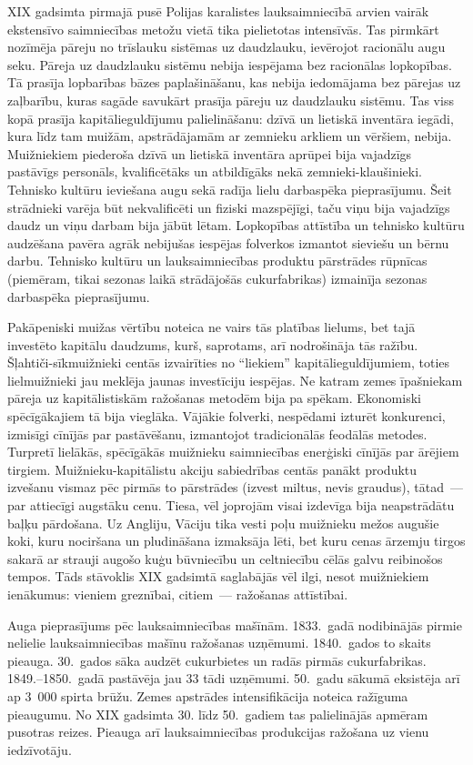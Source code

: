 \documentclass[twoside,a5paper,12pt,fleqn,openany]{extbook}
\begin{document}
XIX gadsimta pirmajā pusē Polijas karalistes lauksaimniecībā arvien vairāk ekstensīvo saimniecības metožu vietā tika pielietotas intensīvās. Tas pirmkārt nozīmēja pāreju no trīslauku sistēmas uz daudzlauku, ievērojot racionālu augu seku. Pāreja uz daudzlauku sistēmu nebija iespējama bez racionālas lopkopības. Tā prasīja lopbarības bāzes paplašināšanu, kas nebija iedomājama bez pārejas uz zaļbarību, kuras sagāde savukārt prasīja pāreju uz daudzlauku sistēmu. Tas viss kopā prasīja kapitālieguldījumu palielināšanu: dzīvā un lietiskā inventāra iegādi, kura līdz tam muižām, apstrādājamām ar zemnieku arkliem un vēršiem, nebija. Muižniekiem piederoša dzīvā un lietiskā inventāra aprūpei bija vajadzīgs pastāvīgs personāls, kvalificētāks un atbildīgāks nekā zemnieki-klaušinieki. Tehnisko kultūru ieviešana augu sekā radīja lielu darbaspēka pieprasījumu. Šeit strādnieki varēja būt nekvalificēti un fiziski mazspējīgi, taču viņu bija vajadzīgs daudz un viņu darbam bija jābūt lētam. Lopkopības attīstība un tehnisko kultūru audzēšana pavēra agrāk nebijušas iespējas folverkos izmantot sieviešu un bērnu darbu. Tehnisko kultūru un lauksaimniecības produktu pārstrādes rūpnīcas (piemēram, tikai sezonas laikā strādājošās cukurfabrikas) izmainīja sezonas darbaspēka pieprasījumu.

Pakāpeniski muižas vērtību noteica ne vairs tās platības lielums, bet tajā investēto kapitālu daudzums, kurš, saprotams, arī nodrošināja tās ražību. Šļahtiči-sīkmuižnieki centās izvairīties no ``liekiem'' kapitālieguldījumiem, toties lielmuižnieki jau meklēja jaunas investīciju iespējas. Ne katram zemes īpašniekam pāreja uz kapitālistiskām ražošanas metodēm bija pa spēkam. Ekonomiski spēcīgākajiem tā bija vieglāka. Vājākie folverki, nespēdami izturēt konkurenci, izmisīgi cīnījās par pastāvēšanu, izmantojot tradicionālās feodālās metodes. Turpretī lielākās, spēcīgākās muižnieku saimniecības enerģiski cīnījās par ārējiem tirgiem. Muižnieku-kapitālistu akciju sabiedrības centās panākt produktu izvešanu vismaz pēc pirmās to pārstrādes (izvest miltus, nevis graudus), tātad~--- par attiecīgi augstāku cenu. Tiesa, vēl joprojām visai izdevīga bija neapstrādātu baļķu pārdošana. Uz Angliju, Vāciju tika vesti poļu muižnieku mežos augušie koki, kuru nociršana un pludināšana izmaksāja lēti, bet kuru cenas ārzemju tirgos sakarā ar strauji augošo kuģu būvniecību un celtniecību cēlās galvu reibinošos tempos. Tāds stāvoklis XIX gadsimtā saglabājās vēl ilgi, nesot muižniekiem ienākumus: vieniem greznībai, citiem~--- ražošanas attīstībai.

Auga pieprasījums pēc lauksaimniecības mašīnām. 1833.~gadā nodibinājās pirmie nelielie lauksaimniecības mašīnu ražošanas uzņēmumi. 1840.~gados to skaits pieauga. 30.~gados sāka audzēt cukurbietes un radās pirmās cukurfabrikas. 1849.--1850.~gadā pastāvēja jau 33 tādi uzņēmumi. 50.~gadu sākumā eksistēja arī ap 3~000 spirta brūžu. Zemes apstrādes intensifikācija noteica ražīguma pieaugumu. No XIX gadsimta 30. līdz 50.~gadiem tas palielinājās apmēram pusotras reizes. Pieauga arī lauksaimniecības produkcijas ražošana uz vienu iedzīvotāju.
\end{document}
